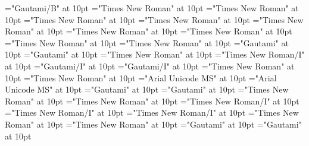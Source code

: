 \documentclass[a4paper]{article}
\begin{document}
\font\LexEntrypublishStemComponentTargetHeadWordRefaentryrefcomponentprimaryrefsentryletDatadicBody="Gautami/B" at 10pt
\font\aentryrefcomponentprimaryrefsentryletDatadicBody="Times New Roman" at 10pt
\font\entryrefcomponentprimaryrefsentryletDatadicBody="Times New Roman" at 10pt
\font\spanenspanenentryreftypeprimaryrefsentryletDatadicBody="Times New Roman" at 10pt
\font\spanenentryreftypeprimaryrefsentryletDatadicBody="Times New Roman" at 10pt
\font\entryreftypeprimaryrefsentryletDatadicBody="Times New Roman" at 10pt
\font\spanenprimaryrefsentryletDatadicBody="Times New Roman" at 10pt
\font\primaryrefsentryletDatadicBody="Times New Roman" at 10pt
\font\spanenexamplessensesensesentryletDatadicBody="Times New Roman" at 10pt
\font\spanentranslationLdtranslationsxitemexamplessensesensesentryletDatadicBody="Times New Roman" at 10pt
\font\spantetranslationLdtranslationsxitemexamplessensesensesentryletDatadicBody="Gautami" at 10pt
\font\translationLdtranslationsxitemexamplessensesensesentryletDatadicBody="Gautami" at 10pt
\font\translationsxitemexamplessensesensesentryletDatadicBody="Times New Roman" at 10pt
\font\spanenexamplexitemexamplessensesensesentryletDatadicBody="Times New Roman/I" at 10pt
\font\spanggoTeluINexamplexitemexamplessensesensesentryletDatadicBody="Gautami/I" at 10pt
\font\examplexitemexamplessensesensesentryletDatadicBody="Gautami/I" at 10pt
\font\xitemexamplessensesensesentryletDatadicBody="Times New Roman" at 10pt
\font\examplessensesensesentryletDatadicBody="Times New Roman" at 10pt
\font\spanhixitemhiLexSensepublishStemGlossPubLdsensesensesentryletDatadicBody="Arial Unicode MS" at 10pt
\font\xitemhiLexSensepublishStemGlossPubLdsensesensesentryletDatadicBody="Arial Unicode MS" at 10pt
\font\spantexitemteLexSensepublishStemGlossPubLdsensesensesentryletDatadicBody="Gautami" at 10pt
\font\xitemteLexSensepublishStemGlossPubLdsensesensesentryletDatadicBody="Gautami" at 10pt
\font\xsensenumberaftersensesensesentryletDatadicBody="Times New Roman" at 10pt
\font\xsensenumbersensesensesentryletDatadicBody="Times New Roman" at 10pt
\font\spanenspanengrammaticalinfoentryletDatadicBody="Times New Roman/I" at 10pt
\font\spanengrammaticalinfoentryletDatadicBody="Times New Roman/I" at 10pt
\font\grammaticalinfoentryletDatadicBody="Times New Roman/I" at 10pt
\font\spanensensesentryletDatadicBody="Times New Roman" at 10pt
\font\spanenLexSensepublishStemGlossPubLdsensesensesentryletDatadicBody="Times New Roman" at 10pt
\font\spanteLexSensepublishStemGlossPubLdsensesensesentryletDatadicBody="Gautami" at 10pt
\font\LexSensepublishStemGlossPubLdsensesensesentryletDatadicBody="Gautami" at 10pt
\end{document}
